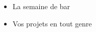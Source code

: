 \begin{frame}
   \begin{itemize}
      \item La semaine de bar
      \item Vos projets en tout genre
   \end{itemize}
\end{frame}
